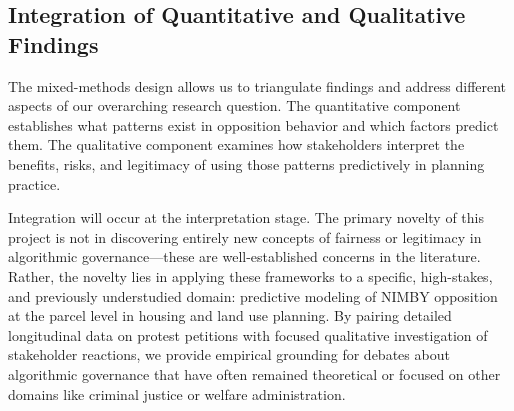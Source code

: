 \documentclass[12pt]{article}
\begin{document}
\subsection{Integration of Quantitative and Qualitative Findings}

The mixed-methods design allows us to triangulate findings and address different aspects of our overarching research question. The quantitative component establishes what patterns exist in opposition behavior and which factors predict them. The qualitative component examines how stakeholders interpret the benefits, risks, and legitimacy of using those patterns predictively in planning practice.

Integration will occur at the interpretation stage. The primary novelty of this project is not in discovering entirely new concepts of fairness or legitimacy in algorithmic governance---these are well-established concerns in the literature. Rather, the novelty lies in applying these frameworks to a specific, high-stakes, and previously understudied domain: predictive modeling of NIMBY opposition at the parcel level in housing and land use planning. By pairing detailed longitudinal data on protest petitions with focused qualitative investigation of stakeholder reactions, we provide empirical grounding for debates about algorithmic governance that have often remained theoretical or focused on other domains like criminal justice or welfare administration.
\end{document}
